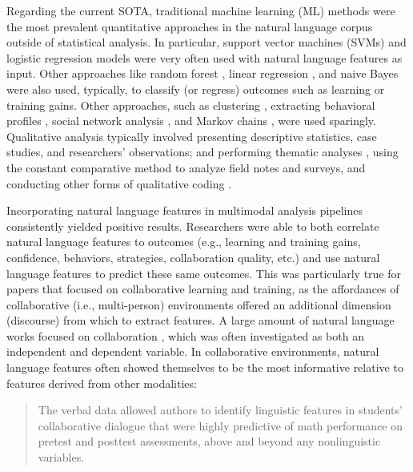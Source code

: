 \documentclass[manuscript,screen,review]{acmart}
\begin{document}
Regarding the current SOTA, traditional machine learning (ML) methods were the most prevalent quantitative approaches in the natural language corpus outside of statistical analysis. In particular, support vector machines (SVMs) \cite{3754172825,85990093,1637690235} and logistic regression models \cite{957160695,3796180663,1576545447} were very often used with natural language features as input. Other approaches like random forest \cite{2273914836}, linear regression \cite{1118315889}, and naive Bayes \cite{1637690235} were also used, typically, to classify (or regress) outcomes such as learning or training gains. Other approaches, such as clustering \cite{2273914836}, extracting behavioral profiles \cite{2273914836}, social network analysis \cite{2345021698}, and Markov chains \cite{3135645357}, were used sparingly. Qualitative analysis typically involved presenting descriptive statistics, case studies, and researchers' observations; and performing thematic analyses \cite{braun2012thematic}, using the constant comparative method \cite{glaser1965constant} to analyze field notes and surveys, and conducting other forms of qualitative coding \cite{2497456347,1847468084,1296637108}.

Incorporating natural language features in multimodal analysis pipelines consistently yielded positive results. Researchers were able to both correlate natural language features to outcomes (e.g., learning and training gains, confidence, behaviors, strategies, collaboration quality, etc.) and use natural language features to predict these same outcomes. This was particularly true for papers that focused on collaborative learning and training, as the affordances of collaborative (i.e., multi-person) environments offered an additional dimension (discourse) from which to extract features. A large amount of natural language works focused on collaboration \cite{1118315889,3095923626,1637690235}, which was often investigated as both an independent and dependent variable. In collaborative environments, natural language features often showed themselves to be the most informative relative to features derived from other modalities:

\begin{quote}
    The verbal data allowed authors to identify linguistic features in students' collaborative dialogue that were highly predictive of math performance on pretest and posttest assessments, above and beyond any nonlinguistic variables. \cite{3796180663}
\end{quote}
\end{document}
